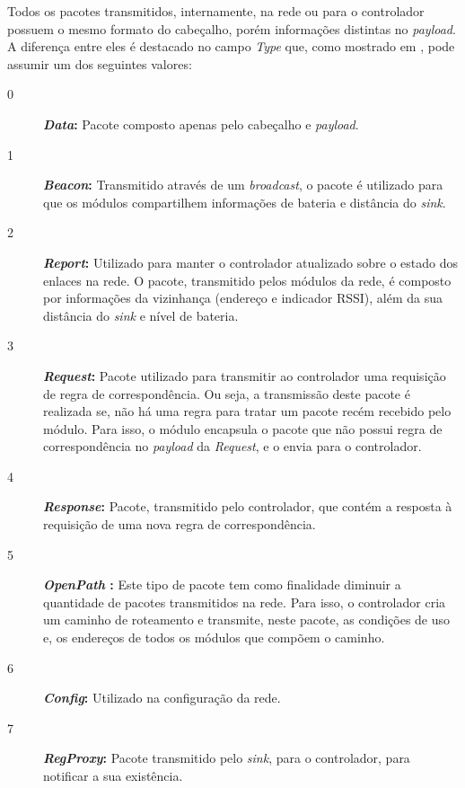 Todos os pacotes transmitidos, internamente, na rede ou para o controlador possuem o mesmo formato do cabeçalho, porém informações distintas no \textit{payload}. A diferença entre eles é destacado no campo \textit{Type} que, como mostrado em , pode assumir um dos seguintes valores:
\begin{description}
    \item [0]\textbf{\textit{Data}:} Pacote composto apenas pelo cabeçalho e \textit{payload}. 
    \item [1]\textbf{\textit{Beacon}:} Transmitido através de um \textit{broadcast}, o pacote é utilizado para que os módulos compartilhem informações de bateria e distância do \textit{sink}.
    \item [2]\textbf{\textit{Report}:} Utilizado para manter o controlador atualizado sobre o estado dos enlaces na rede. O pacote, transmitido pelos módulos da rede, é composto por informações da vizinhança (endereço e indicador \ac{RSSI}), além da sua distância do \textit{sink} e nível de bateria.   
    \item [3]\textbf{\textit{Request}:} Pacote utilizado para transmitir ao controlador uma requisição de regra de correspondência. Ou seja, a transmissão deste pacote é realizada se, não há uma regra para tratar um pacote recém recebido pelo módulo. Para isso, o módulo encapsula o pacote que não possui regra de correspondência no \textit{payload} da \textit{Request}, e o envia para o controlador. 
    \item [4]\textbf{\textit{Response}:} Pacote, transmitido pelo controlador, que contém a resposta à requisição de uma nova regra de correspondência.
    \item [5]\textbf{\textit{OpenPath }:} Este tipo de pacote tem como finalidade diminuir a quantidade de pacotes transmitidos na rede. Para isso, o controlador cria um caminho de roteamento e transmite, neste pacote, as condições de uso e, os endereços de todos os módulos que compõem o caminho.
    \item [6]\textbf{\textit{Config}:} Utilizado na configuração da rede.
    \item [7]\textbf{\textit{RegProxy}:} Pacote transmitido pelo \textit{sink}, para o controlador, para notificar a sua existência.
\end{description}

